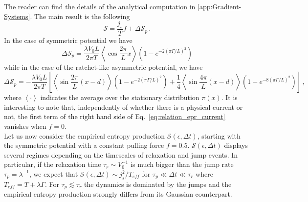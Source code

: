 \documentclass[12pt]{iopart}
\newcommand{\lx} {\left}
\newcommand{\rx} {\right}
\newcommand{\ave}[1] {\lx\langle #1 \rx\rangle}
\newcommand{\cS} {\mathcal{S}}
\begin{document}
The reader can find the details of the analytical computation in \textcolor{black}{\ref{app:Gradient-Systems}}.
The main result is the following 
\begin{equation}
\cS=\frac{j_s}{T}f + \Delta \cS_p\,.
\label{eq:relation_epr_current}
\end{equation}
In the case of symmetric potential we have
\begin{equation}
\Delta \cS_p = \frac{\lambda V_0 L}{2\pi T}\ave{\cos{\frac{2\pi}{L}x}} \lx(1-e^{-2\lx(\pi \Gamma/L\rx)^2}\rx)
\end{equation}
while in the case of the ratchet-like asymmetric potential, we have
\begin{equation}
\Delta \cS_p =-\frac{\lambda V_0 L}{2\pi T}\lx[\ave{\sin{\frac{2\pi}{L}(x-d)}} \lx(1-e^{-2\lx(\pi \Gamma/L\rx)^2}\rx)+\frac{1}{4}\ave{\sin{\frac{4\pi}{L}(x-d)}} \lx(1-e^{-8\lx(\pi \Gamma/L\rx)^2}\rx)\rx]\,,
\end{equation}
where $\ave{\cdot}$ indicates the average over the stationary distribution $\pi(x)$.
It is interesting to note that, independently of whether there is a physical current or not, the first term \textcolor{black}{of the right hand side of Eq.~\ref{eq:relation_epr_current}} vanishes when $f=0$. \\
Let us now consider the empirical entropy production $\cS(\epsilon,\Delta t)$, starting with the symmetric potential with a constant pulling force $f=0.5$. $\cS(\epsilon,\Delta t)$ \textcolor{black}{displays} several regimes depending on the timescales of relaxation and jump events. In particular, if the relaxation time $\tau_r\sim V_0^{-1}$ is much bigger than the jump rate $\tau_p=\lambda^{-1}$, we expect that $\cS(\epsilon,\Delta t)\sim j_s^2/T_{eff}$  for $\tau_p\ll\Delta t \ll \tau_r$ where $T_{eff}=T+\lambda\Gamma$. For $\tau_p\lesssim \tau_r$ the dynamics is dominated by the jumps and the empirical entropy production strongly \textcolor{black}{differs} from its Gaussian counterpart. 
\end{document}
